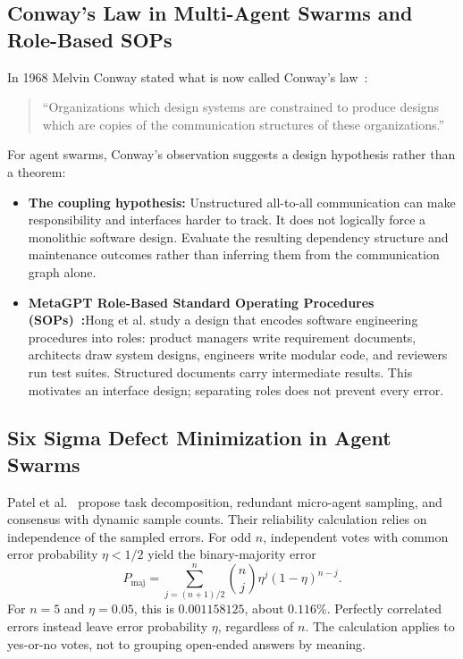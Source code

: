 \subsection{Conway's Law in Multi-Agent Swarms and Role-Based SOPs}

In 1968 Melvin Conway stated what is now called Conway's law~:
\begin{quote}
``Organizations which design systems are constrained to produce designs which are copies of the communication structures of these organizations.''
\end{quote}
For agent swarms, Conway's observation suggests a design hypothesis rather than a theorem:
\begin{itemize}[leftmargin=1.8em,itemsep=2pt]
  \item \textbf{The coupling hypothesis:} Unstructured all-to-all communication can make responsibility and interfaces harder to track. It does not logically force a monolithic software design. Evaluate the resulting dependency structure and maintenance outcomes rather than inferring them from the communication graph alone.
  \item \textbf{MetaGPT Role-Based Standard Operating Procedures (SOPs)~:}\enspace Hong et al. study a design that encodes software engineering procedures into roles: product managers write requirement documents, architects draw system designs, engineers write modular code, and reviewers run test suites. Structured documents carry intermediate results. This motivates an interface design; separating roles does not prevent every error.
\end{itemize}

\subsection{Six Sigma Defect Minimization in Agent Swarms}

Patel et al.~ propose task decomposition, redundant micro-agent sampling, and consensus with dynamic sample counts. Their reliability calculation relies on independence of the sampled errors. For odd $n$, independent votes with common error probability $\eta<1/2$ yield the binary-majority error
\begin{equation}
P_{\mathrm{maj}}=\sum_{j=(n+1)/2}^{n}{n\choose j}\eta^j(1-\eta)^{n-j}.
\end{equation}
For $n=5$ and $\eta=0.05$, this is $0.001158125$, about $0.116\%$. Perfectly correlated errors instead leave error probability $\eta$, regardless of $n$. The calculation applies to yes-or-no votes, not to grouping open-ended answers by meaning.

